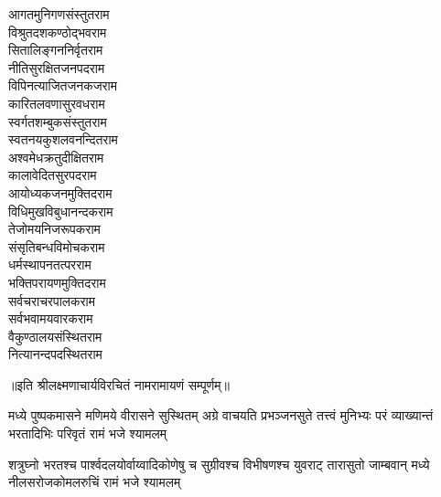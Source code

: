 \begin{large}
\begin{multicols}{2}
आगतमुनिगणसंस्तुत\hfill राम\\
विश्रुतदशकण्ठोद्भव\hfill राम\\
सितालिङ्गननिर्वृत\hfill राम\\
नीतिसुरक्षितजनपद\hfill राम\\
विपिनत्याजितजनकज\hfill राम\\
कारितलवणासुरवध\hfill राम\\
स्वर्गतशम्बुकसंस्तुत\hfill राम\\
स्वतनयकुशलवनन्दित\hfill राम\\
अश्वमेधक्रतुदीक्षित\hfill राम\\
कालावेदितसुरपद\hfill राम\\
आयोध्यकजनमुक्तिद\hfill राम\\
विधिमुखविबुधानन्दक\hfill राम\\
तेजोमयनिजरूपक\hfill राम\\
संसृतिबन्धविमोचक\hfill राम\\
धर्मस्थापनतत्पर\hfill राम\\
भक्तिपरायणमुक्तिद\hfill राम\\
सर्वचराचरपालक\hfill राम\\
सर्वभवामयवारक\hfill राम\\
वैकुण्ठालयसंस्थित\hfill राम\\
नित्यानन्दपदस्थित\hfill राम\\
\jaya
\end{multicols}
\vspace{-0.5cm}
॥इति श्रीलक्ष्मणाचार्यविरचितं नामरामायणं सम्पूर्णम्॥
\end{large}

\closesub

{मध्ये पुष्पकमासने मणिमये वीरासने सुस्थितम्}
{अग्रे वाचयति प्रभञ्जनसुते तत्त्वं मुनिभ्यः परं}
{व्याख्यान्तं भरतादिभिः परिवृतं रामं भजे श्यामलम्}

{शत्रुघ्नो भरतश्च पार्श्वदलयोर्वाय्वादिकोणेषु च}
{सुग्रीवश्च विभीषणश्च युवराट् तारासुतो जाम्बवान्}
{मध्ये नीलसरोजकोमलरुचिं रामं भजे श्यामलम्}
